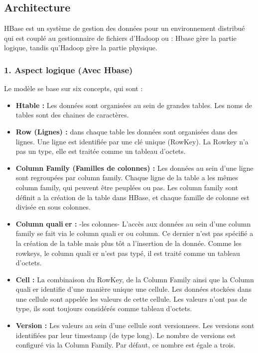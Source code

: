 \subsection{Architecture}
HBase est un système de gestion des données pour un environnement distribué qui est couplé au gestionnaire de fichiers d'Hadoop ou : Hbase gère la partie logique, tandis qu'Hadoop gère la partie physique.

\subsubsection*{1. Aspect logique (Avec Hbase)}

Le modèle se base sur six concepts, qui sont :

\begin{itemize}[label=\textbullet]

\item \textbf{Htable :} Les données sont organisées au sein de grandes tables. Les noms de tables sont des chaines de caractères.

\item \textbf{Row (Lignes) :} dans chaque table les données sont organisées dans des lignes. Une ligne est identifiée par une clé unique (RowKey). La Rowkey n'a pas un type, elle est traitée comme un tableau d'octets.

\item \textbf{Column Family (Familles de colonnes) :} Les données au sein d'une ligne sont regroupées par column family. Chaque ligne de la table a les mêmes column family, qui peuvent être peuplées ou pas. Les column family sont définit a la création de la table dans HBase, et chaque famille de colonne est divisée en sous colonnes.

\item \textbf{Column qualier :} -les colonnes- L'accès aux données au sein d'une column family se fait via le column qualier ou column. Ce dernier n'est pas spécifié a la création de la table mais plus tôt a l'insertion de la donnée. Comme les rowkeys, le column qualier n'est pas typé, il est traité comme un tableau d'octets.

\item \textbf{Cell :} La combinaison du RowKey, de la Column Family ainsi que la Column qualier identifie d'une manière unique une cellule. Les données stockées dans une cellule sont appelée les valeurs de cette cellule. Les valeurs n'ont pas de type, ils sont toujours considérés comme tableau d'octets.

\item \textbf{Version :} Les valeurs au sein d'une cellule sont versionnees. Les versions sont identifiées par leur timestamp (de type long). Le nombre de versions est configuré via la Column Family. Par défaut, ce nombre est égale a trois.

\end{itemize}

